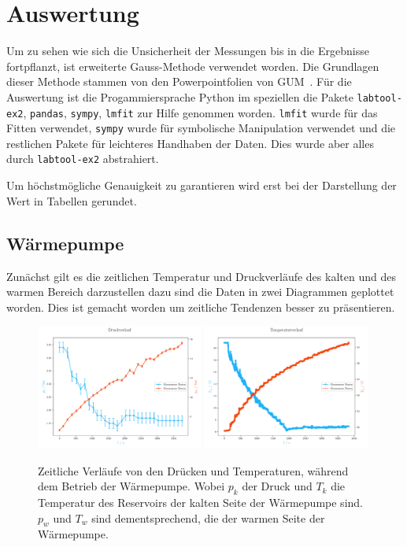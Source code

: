 \documentclass[12pt,english,ngerman]{scrartcl}
\begin{document}
\section{Auswertung}\label{sec:auswertung}

Um zu sehen wie sich die Unsicherheit der Messungen bis in die Ergebnisse
fortpflanzt, ist erweiterte Gauss-Methode verwendet worden. Die Grundlagen
dieser Methode stammen von den Powerpointfolien von
GUM~\cite{wolfgang_kessel_isobipm-gum_2004}. Für die Auswertung ist die
Progammiersprache Python im speziellen die Pakete \verb#labtool-ex2#,
\verb#pandas#, \verb#sympy#, \verb#lmfit# zur Hilfe genommen worden.
\verb#lmfit# wurde für das Fitten verwendet, \verb#sympy# wurde für symbolische
Manipulation verwendet und die restlichen Pakete für leichteres Handhaben der
Daten. Dies wurde aber alles durch \verb#labtool-ex2# abstrahiert.

Um höchstmögliche Genauigkeit zu garantieren wird erst bei der Darstellung der
Wert in Tabellen gerundet.

\subsection{Wärmepumpe}

Zunächst gilt es die zeitlichen Temperatur und Druckverläufe des kalten und des
warmen Bereich darzustellen dazu sind die Daten in zwei Diagrammen geplottet
worden. Dies ist gemacht worden um zeitliche Tendenzen besser zu präsentieren.

\begin{figure}[H]
	\centering
	\includegraphics[width=0.49\textwidth]{figures/pressureProfile.pdf}
	\includegraphics[width=0.49\textwidth]{figures/temperatureProfile.pdf}
	\caption[Zeitliche Verläufe von den Drücken und Temperaturen, während dem Betrieb der
		Wärmepumpe]{Zeitliche Verläufe von den Drücken und Temperaturen, während dem
		Betrieb der Wärmepumpe. Wobei $p_k$ der Druck und $T_k$ die Temperatur des
		Reservoirs der kalten Seite der Wärmepumpe sind. $p_w$ und $T_w$ sind
		dementsprechend, die der warmen Seite der Wärmepumpe.
	}\label{fig:druckTemperaturVerlauf}
\end{figure}
\end{document}
